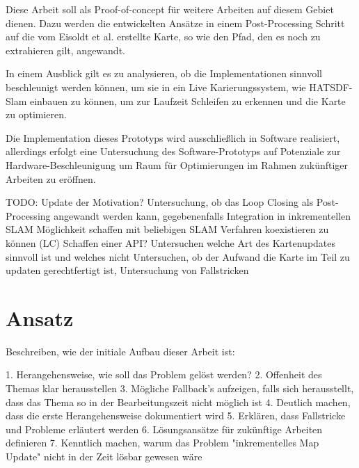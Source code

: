 Diese Arbeit soll als Proof-of-concept für weitere Arbeiten auf diesem Gebiet dienen. Dazu werden die entwickelten Ansätze in einem Post-Processing Schritt auf die vom Eisoldt et al. \cite{HATSDF} erstellte Karte, so wie den Pfad, den es noch zu extrahieren gilt, angewandt.


In einem Ausblick gilt es zu analysieren, ob die Implementationen sinnvoll beschleunigt werden können, um sie in ein Live Karierungssystem, wie HATSDF-Slam einbauen zu können, um zur Laufzeit Schleifen zu erkennen und die Karte zu optimieren.

Die Implementation dieses Prototyps wird ausschließlich in Software realisiert, allerdings erfolgt eine Untersuchung des Software-Prototyps auf Potenziale zur Hardware-Beschleunigung um Raum für Optimierungen im Rahmen zukünftiger Arbeiten zu eröffnen.

TODO: Update der Motivation? 
Untersuchung, ob das Loop Closing als Post-Processing angewandt werden kann, gegebenenfalls Integration in inkrementellen SLAM
Möglichkeit schaffen mit beliebigen SLAM Verfahren koexistieren zu können (LC)
Schaffen einer API?
Untersuchen welche Art des Kartenupdates sinnvoll ist und welches nicht
Untersuchen, ob der Aufwand die Karte im Teil zu updaten gerechtfertigt ist, Untersuchung von Fallstricken

\section{Ansatz}

Beschreiben, wie der initiale Aufbau dieser Arbeit ist:

1. Herangehensweise, wie soll das Problem gelöst werden?
2. Offenheit des Themas klar herausstellen
3. Mögliche Fallback's aufzeigen, falls sich herausstellt, dass das Thema so in der Bearbeitungszeit nicht möglich ist
4. Deutlich machen, dass die erste Herangehensweise dokumentiert wird
5. Erklären, dass Fallstricke und Probleme erläutert werden
6. Lösungsansätze für zukünftige Arbeiten definieren
7. Kenntlich machen, warum das Problem "inkrementelles Map Update" nicht in der Zeit lösbar gewesen wäre


